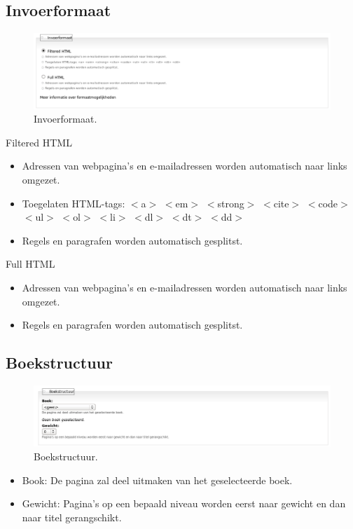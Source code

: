 \subsection{Invoerformaat} 

 \begin{figure}[!h]
    \centering
   \includegraphics[scale=0.3,angle=0]{invoerformaat}
   \caption{Invoerformaat.\label{white}}
 \end{figure}
Filtered HTML  
        \begin{itemize}
            \item Adressen van webpagina's en e-mailadressen worden automatisch naar links omgezet.
            \item Toegelaten HTML-tags: $<$a$>$ $<$em$>$ $<$strong$>$ $<$cite$>$
            $<$code$>$ $<$ul$>$ $<$ol$>$ $<$li$>$ $<$dl$>$ $<$dt$>$ $<$dd$>$
            \item Regels en paragrafen worden automatisch gesplitst.
        \end{itemize} 
Full HTML 
        \begin{itemize}
            \item Adressen van webpagina's en e-mailadressen worden automatisch
            naar links omgezet.
            \item Regels en paragrafen worden automatisch gesplitst.
        \end{itemize}

\subsection{Boekstructuur} 
 \begin{figure}[!h]
    \centering
   \includegraphics[scale=0.3,angle=0]{boekstructuur}
   \caption{Boekstructuur.\label{white}}
 \end{figure}
\begin{itemize}
  \item Book: De pagina zal deel uitmaken van het geselecteerde boek.
  \item Gewicht:  Pagina's op een bepaald niveau worden eerst
  naar gewicht en dan naar titel gerangschikt.
\end{itemize}

